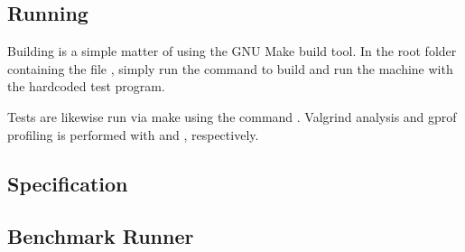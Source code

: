 \subsection{Running \thename{}}
\label{sec:appendix:make}

Building \thename{} is a simple matter of using the GNU Make build tool. In the
root folder containing the file , simply run the command
 to build and run the machine with the hardcoded test program.

Tests are likewise run via make using the command . Valgrind
analysis and gprof profiling is performed with  and
, respectively.

\subsection{\thename{} Specification}
\label{sec:appendix:spec}


\subsection{Benchmark Runner}
\label{appendix:benchmark}

